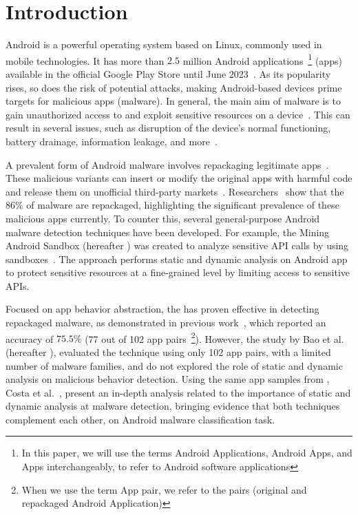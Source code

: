 \section{Introduction}\label{sec:introduction}

Android is a powerful operating system based on Linux, commonly used in mobile technologies. It has more than $2.5$ million Android applications~\footnote{In this paper, we will use the terms Android Applications, Android Apps, and Apps interchangeably, to refer to Android software applications} (apps) available in the official Google Play Store until June 2023~\cite{Statista}. As its popularity rises, so does the risk of potential attacks, making Android-based devices prime targets for malicious apps (malware). In general, the main aim of malware is to gain unauthorized access to and exploit sensitive resources on a device~\cite{DBLP:conf/ccs/FeltFCHW11,DBLP:journals/eswa/SurendranTE20}. This can result in several issues, such as disruption of the device's normal functioning, battery drainage, information leakage, and more~\cite{DBLP:conf/ccs/FeltFCHW11,DBLP:conf/sp/ZhouJ12}.

A prevalent form of Android malware involves repackaging legitimate apps~\cite{DBLP:conf/wcre/BaoLL18, le2018towards}. These malicious variants can insert or modify the original apps with harmful code and release them on unofficial third-party markets~\cite{DBLP:journals/tdsc/TianYRTP20}. Researchers~\cite{DBLP:journals/tdsc/TianYRTP20,DBLP:conf/sp/ZhouJ12,DBLP:journals/compsec/MerloRSV21} show that the $86\%$ of malware are repackaged, highlighting the significant prevalence of these malicious apps currently. To counter this, several general-purpose Android malware detection techniques have been developed. For example, the Mining Android Sandbox (hereafter \mas) was created to analyze sensitive API calls by using sandboxes~\cite{DBLP:conf/icse/JamrozikSZ16}. The approach performs static and dynamic analysis on Android app to protect sensitive resources at a fine-grained level by limiting access to sensitive APIs.

Focused on app behavior abstraction, the \mas has proven effective in detecting repackaged malware, as demonstrated in previous work~\cite{DBLP:conf/wcre/BaoLL18}, which reported an accuracy of $75.5\%$ (77 out of 102 app pairs~\footnote{When we use the term App pair, we refer to the pairs (original and repackaged Android Application)}). However, the study by Bao et al.~\cite{DBLP:conf/wcre/BaoLL18} (hereafter \blls), evaluated the technique using only 102 app pairs, with a limited number of malware families, and do not explored the role of static and dynamic analysis on malicious behavior detection. Using the same app samples from \blls, Costa et al.~\cite{DBLP:jourals/jjc/Handrick22}, present an in-depth analysis related to the importance of static and dynamic analysis at malware detection, bringing evidence that both techniques complement each other, on Android malware classification task. 

